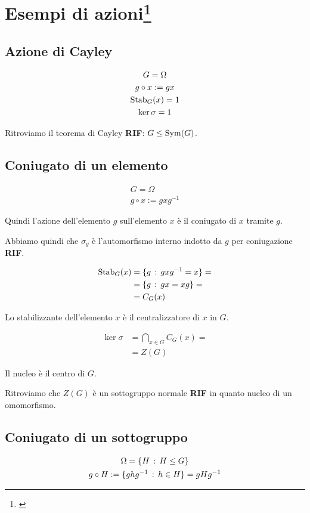 \section[Esempi di azioni]{Esempi di azioni\footnote{\cite[8 novembre 2021]{lucchini}}}

\subsection{Azione di Cayley}

\begin{gather}
	G = \Omega \\
	g \circ x := gx \\
	\operatorname{Stab}_G(x) = 1 \\
	\ker \sigma = 1
\end{gather}

Ritroviamo il teorema di Cayley \textbf{RIF}: $G \le \operatorname{Sym}(G)$.

\subsection{Coniugato di un elemento}

\begin{gather}
	G = \Omega \\
	g \circ x := gxg^{-1}
\end{gather}

Quindi l'azione dell'elemento $g$ sull'elemento $x$ è il coniugato di $x$ tramite $g$.

Abbiamo quindi che $\sigma_g$ è l'automorfismo interno indotto da $g$ per coniugazione \textbf{RIF}.

\begin{align}
	\operatorname{Stab}_G(x) &= \{g \,:\, gxg^{-1} = x \} = \\\
	&= \{g \,:\, gx = xg \} = \\
	&= C_G(x)
\end{align}

Lo stabilizzante dell'elemento $x$ è il centralizzatore di $x$ in $G$.

\begin{align}
	\ker \sigma &= \bigcap_{x \in G} C_G(x) = \\
	&= Z(G)
\end{align}

Il nucleo è il centro di $G$.

Ritroviamo che $Z(G)$ è un sottogruppo normale \textbf{RIF} in quanto nucleo di un omomorfismo.

\subsection{Coniugato di un sottogruppo}
\label{subsec:coniugato_sottogruppo}
\begin{gather*}
	\Omega = \{ H \,:\, H \le G \} \\
	g \circ H := \{ghg^{-1} \,:\, h \in H\} = gHg^{-1}
\end{gather*}

